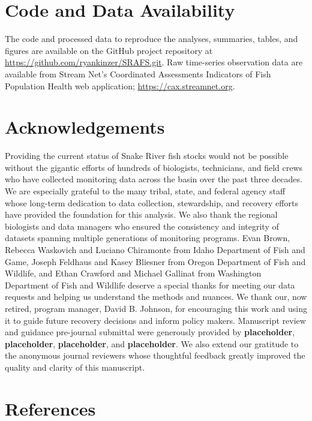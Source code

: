 \documentclass[12pt,a4paper]{article}
\begin{document}
\section{Code and Data Availability}\label{code-and-data-availability}

The code and processed data to reproduce the analyses, summaries, tables, and figures are available on the GitHub project repository at \url{https://github.com/ryankinzer/SRAFS.git}. Raw time-series observation data are available from Stream Net's Coordinated Assessments Indicators of Fish Population Health web application; \url{https://cax.streamnet.org}.

\section{Acknowledgements}\label{acknowledgements}

Providing the current status of Snake River fish stocks would not be possible without the gigantic efforts of hundreds of biologists, technicians, and field crews who have collected monitoring data across the basin over the past three decades. We are especially grateful to the many tribal, state, and federal agency staff whose long-term dedication to data collection, stewardship, and recovery efforts have provided the foundation for this analysis. We also thank the regional biologists and data managers who ensured the consistency and integrity of datasets spanning multiple generations of monitoring programs. Evan Brown, Rebecca Waskovich and Luciano Chiramonte from Idaho Department of Fish and Game, Joseph Feldhaus and Kasey Bliesner from Oregon Department of Fish and Wildlife, and Ethan Crawford and Michael Gallinat from Washington Department of Fish and Wildlife deserve a special thanks for meeting our data requests and helping us understand the methods and nuances. We thank our, now retired, program manager, David B. Johnson, for encouraging this work and using it to guide future recovery decisions and inform policy makers. Manuscript review and guidance pre-journal submittal were generously provided by \textbf{placeholder}, \textbf{placeholder}, \textbf{placeholder}, and \textbf{placeholder}. We also extend our gratitude to the anonymous journal reviewers whose thoughtful feedback greatly improved the quality and clarity of this manuscript.

\clearpage

\section{References}\label{references}
\end{document}
